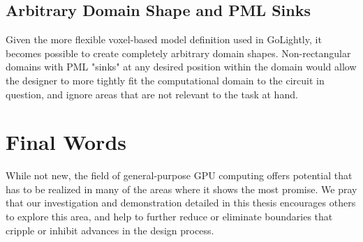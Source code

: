 \subsection{Arbitrary Domain Shape and PML Sinks}
Given the more flexible voxel-based model definition used in GoLightly, it becomes possible to create completely arbitrary domain shapes. Non-rectangular domains with PML "sinks" at any desired position within the domain would allow the designer to more tightly fit the computational domain to the circuit in question, and ignore areas that are not relevant to the task at hand. 


\section{Final Words}

While not new, the field of general-purpose GPU computing offers potential that has to be realized in many of the areas where it shows the most promise. We pray that our investigation and demonstration detailed in this thesis encourages others to explore this area, and help to further reduce or eliminate boundaries that cripple or inhibit advances in the design process.




